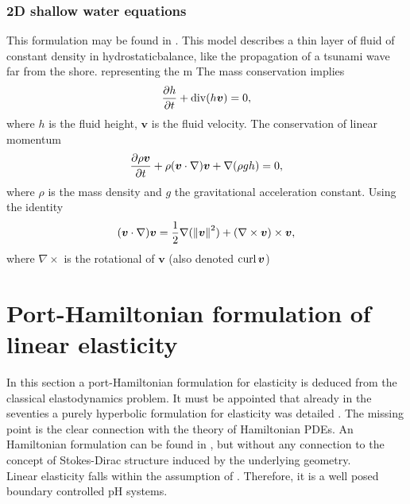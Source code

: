 \subsubsection{2D shallow water equations}
This formulation may be found in \cite[Section 6.2.]{cardoso2016}. This model describes  a thin layer of fluid of constant density in hydrostaticbalance, like the propagation of a tsunami wave far from the shore. representing the m  The mass conservation implies
\[
\diffp{h}{t} + \div(h\bm{v}) = 0,
\]
where $h$ is the fluid height, $\bm{v}$ is the fluid velocity. The conservation of linear momentum 
\[
\diffp{\rho\bm{v}}{t} + \rho (\bm{v} \cdot \nabla) \bm{v} + \nabla(\rho g h) = 0,
\]
where $\rho$ is the mass density and $g$ the gravitational acceleration constant. Using the identity
\[
(\bm{v} \cdot \nabla) \bm{v} = \frac{1}{2} \nabla(\left\|\bm{v}\right\|^2)  + (\nabla \times \bm{v}) \times \bm{v}, 
\]
where $\nabla \times$ is the rotational of $\bm{v}$ (also denoted $\operatorname*{curl} \bm{v}$)


\section{Port-Hamiltonian formulation of linear elasticity}\label{sec:pHelas}

In this section a port-Hamiltonian formulation for elasticity is deduced from the classical elastodynamics problem. It must be appointed that already in the seventies a purely hyperbolic formulation for elasticity was detailed \cite{hughes1978classical}. The missing point is the clear connection with the theory of Hamiltonian PDEs. An Hamiltonian formulation can be found in \cite{grinfield2015}, but without any connection to the concept of Stokes-Dirac structure induced by the underlying geometry. \\

Linear elasticity falls within the assumption of \cite{skrepek2019wellposedness}. Therefore, it is a well posed boundary controlled pH systems. 



\newpage
